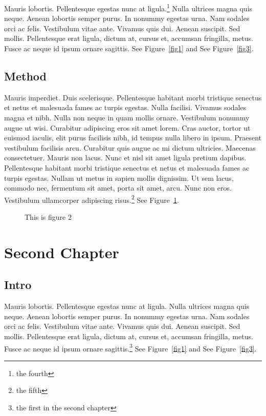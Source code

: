 \documentclass{report}
\begin{document}
Mauris lobortis. Pellentesque egestas nunc at ligula.\footnote{the fourth} Nulla ultrices magna quis
neque. Aenean lobortis semper purus. In nonummy egestas urna. Nam sodales orci
ac felis. Vestibulum vitae ante. Vivamus quis dui. Aenean suscipit. Sed mollis.
Pellentesque erat ligula, dictum at, cursus et, accumsan fringilla, metus. Fusce
ac neque id ipsum ornare sagittis.  See Figure~\ref{fig1} and See Figure~\ref{fig3}.

\section{Method}
Mauris imperdiet. Duis scelerisque. Pellentesque habitant morbi tristique
senectus et netus et malesuada fames ac turpis egestas. Nulla facilisi. Vivamus
sodales magna et nibh. Nulla non neque in quam mollis ornare. Vestibulum nonummy
augue ut wisi. Curabitur adipiscing eros sit amet lorem. Cras auctor, tortor ut
euismod iaculis, elit purus facilisis nibh, id tempus nulla libero in ipsum.
Praesent vestibulum facilisis arcu. Curabitur quis augue ac mi dictum ultricies.
Maecenas consectetuer. Mauris non lacus. Nunc et nisl sit amet ligula pretium
dapibus. Pellentesque habitant morbi tristique senectus et netus et malesuada
fames ac turpis egestas. Nullam ut metus in sapien mollis dignissim. Ut sem
lacus, commodo nec, fermentum sit amet, porta sit amet, arcu. Nunc non eros.
Vestibulum ullamcorper adipiscing risus.\footnote{the fifth}  See Figure~\ref{fig2}.

\begin{figure}[h]
\begin{center}
\vspace{2cm}
\label{fig2}
\caption{This is figure 2}
\end{center}
\end{figure}

\chapter{Second Chapter}

\section{Intro}
Mauris lobortis. Pellentesque egestas nunc at ligula. Nulla ultrices magna quis
neque. Aenean lobortis semper purus. In nonummy egestas urna. Nam sodales orci
ac felis. Vestibulum vitae ante. Vivamus quis dui. Aenean suscipit. Sed mollis.
Pellentesque erat ligula, dictum at, cursus et, accumsan fringilla, metus. Fusce
ac neque id ipsum ornare sagittis.\footnote{the first in the second chapter}  See Figure~\ref{fig1} and See Figure~\ref{fig3}.
\end{document}
